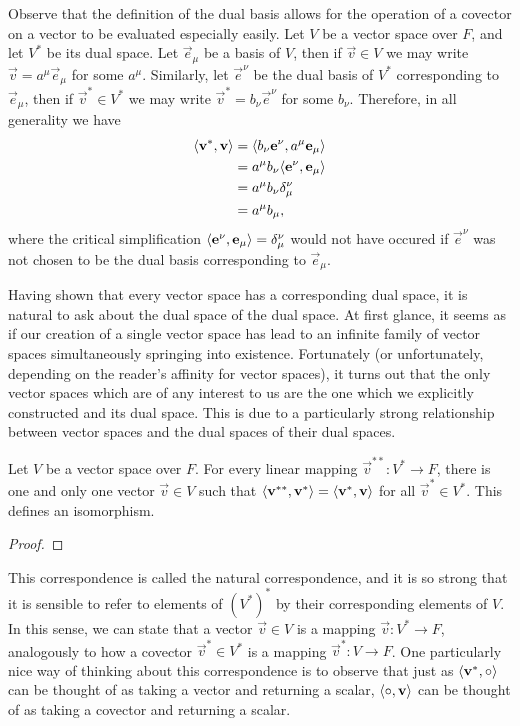 \documentclass[../main.tex]{subfiles}
\begin{document}
    Observe that the definition of the dual basis allows for the operation of a covector on a vector to be evaluated especially easily. Let \(V\) be a vector space over \(F\), and let \(V^{*}\) be its dual space. Let \(\vec{e}_{\mu}\) be a basis of \(V\), then if \(\vec{v}\in{}V\) we may write \(\vec{v}=a^{\mu}\vec{e}_{\mu}\) for some \(a^{\mu}\). Similarly, let \(\vec{e}^{\nu}\) be the dual basis of \(V^{*}\) corresponding to \(\vec{e}_{\mu}\), then if \(\vec{v}^{*}\in{}V^{*}\) we may write \(\vec{v}^{*}=b_{\nu}\vec{e}^{\nu}\) for some \(b_{\nu}\). Therefore, in all generality we have
    \begin{align*}
        \langle\mathbf{v}^{*},\mathbf{v}\rangle&=\langle b_{\nu}\mathbf{e}^{\nu},a^{\mu}\mathbf{e}_{\mu}\rangle\\
                                  &=a^{\mu}b_{\nu}\langle\mathbf{e}^{\nu},\mathbf{e}_{\mu}\rangle\\
                                  &=a^{\mu}b_{\nu}\delta_{\mu}^{\nu}\\
                                  &=a^{\mu}b_{\mu},
    \end{align*}
    where the critical simplification \(\langle\mathbf{e}^{\nu},\mathbf{e}_{\mu}\rangle=\delta_{\mu}^{\nu}\) would not have occured if \(\vec{e}^{\nu}\) was not chosen to be the dual basis corresponding to \(\vec{e}_{\mu}\).

    Having shown that every vector space has a corresponding dual space, it is natural to ask about the dual space of the dual space. At first glance, it seems as if our creation of a single vector space has lead to an infinite family of vector spaces simultaneously springing into existence. Fortunately (or unfortunately, depending on the reader's affinity for vector spaces), it turns out that the only vector spaces which are of any interest to us are the one which we explicitly constructed and its dual space. This is due to a particularly strong relationship between vector spaces and the dual spaces of their dual spaces.
    \begin{theorem}
        Let \(V\) be a vector space over \(F\). For every linear mapping \(\vec{v}^{**}:V^{*}\to{}F\), there is one and only one vector \(\vec{v}\in{}V\) such that \(\langle\mathbf{v}^{**},\mathbf{v}^{*}\rangle=\langle\mathbf{v}^{*},\mathbf{v}\rangle\) for all \(\vec{v}^{*}\in{}V^{*}\). This defines an isomorphism.
        \begin{proof}
        \end{proof}
    \end{theorem}
    This correspondence is called the natural correspondence, and it is so strong that it is sensible to refer to elements of \((V^{*})^{*}\) by their corresponding elements of \(V\). In this sense, we can state that a vector \(\vec{v}\in{}V\) is a mapping \(\vec{v}:V^{*}\to{}F\), analogously to how a covector \(\vec{v}^{*}\in{}V^{*}\) is a mapping \(\vec{v}^{*}:V\to{}F\). One particularly nice way of thinking about this correspondence is to observe that just as \(\langle\mathbf{v}^{*},\circ\rangle\) can be thought of as taking a vector and returning a scalar, \(\langle\circ,\mathbf{v}\rangle\) can be thought of as taking a covector and returning a scalar.
\end{document}
